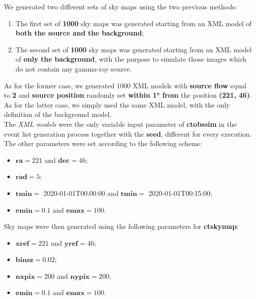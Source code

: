 \documentclass[a4paper,12pt,oneside]{book}
\begin{document}
\begin{onehalfspace}
	We generated two different sets of sky maps using the two previous methods:
	\begin{enumerate}[itemsep=0em]
	    \item The first set of \textbf{1000} sky maps was generated starting from an XML model of \textbf{both the source and the background};
	    \item The second set of \textbf{1000} sky maps was generated starting from an XML model of \textbf{only the background}, with the purpose to simulate those images which do not contain any gamma-ray source.
	\end{enumerate}
	As for the former case, we generated 1000 XML models with \textbf{source flow} equal to \textbf{2} and \textbf{source position} randomly set \textbf{within 1° from} the position \textbf{(221, 46)}. \\
	As for the latter case, we simply used the same XML model, with the only definition of the background model. \\
	The \textit{XML models} were the only variable input parameter of \textbf{ctobssim} in the event list generation process together with the $\bm{seed}$, different for every execution. The other parameters were set according to the following scheme:
	\begin{itemize}
	    \setlength\itemsep{0em}
	    \item $\bm{ra}=221$ and $\bm{dec}=46$;
	    \item $\bm{rad}=5$;
	    \item $\bm{tmin}=$ 2020-01-01T00:00:00 and $\bm{tmin}=$ 2020-01-01T00:15:00;
	    \item $\bm{emin}=0.1$ and $\bm{emax}=100$.
	\end{itemize}
    Sky maps were then generated using the following parameters for \textbf{ctskymap}:
    \begin{itemize}
	    \setlength\itemsep{0em}
	    \item $\bm{xref}=221$ and $\bm{yref}=46$;
	    \item $\bm{binsz}=0.02$;
	    \item $\bm{nxpix}=200$ and $\bm{nypix}=200$;
	    \item $\bm{emin}=0.1$ and $\bm{emax}=100$.
	\end{itemize}
	
	\newpage 
	

\end{onehalfspace}
\end{document}
